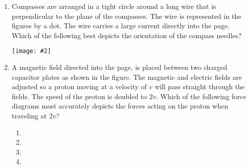 \documentclass[11pt]{article}
\newcommand{\pic}[2]{\texttt{[image: \#2]}}
\begin{document}
\begin{multicols}{2}
\begin{enumerate}[leftmargin=18pt]
  \item Compasses are arranged in a tight circle around a long wire that is
    perpendicular to the plane of the compasses. The wire is represented in
    the figures by a dot. The wire carries a large current directly into the
    page. Which of the following best depicts the orientation of the compass
    needles?
    
    \pic{.45}{screen3.png}
  
    \columnbreak

  \item A magnetic field directed into the page, is placed between two charged
    capacitor plates as shown in the figure. The magnetic and electric fields
    are adjusted so a proton moving at a velocity of $v$ will pass straight
    through the fields. The speed of the proton is doubled to $2v$. Which of
    the following force diagrams most accurately depicts the forces acting on
    the proton when traveling at $2v$?
    \begin{center}
    \end{center}
    
    \begin{enumerate}[noitemsep,topsep=0pt,leftmargin=18pt,label=(\Alph*)]
    \item\hspace{.4in}
    \item\hspace{.4in}
    \item{}
    \item{}
    \end{enumerate}
  \end{enumerate}


\end{multicols}
\end{document}
